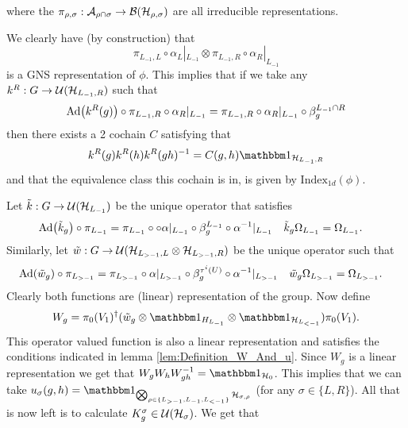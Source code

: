 \documentclass[12pt,a4paper,twoside]{article}
\numberwithin{equation}{section}
\begin{document}
where the $\pi_{\rho,\sigma}:\mathcal A_{\rho\cap\sigma}\rightarrow\mathcal B(\mathcal H_{\rho,\sigma})$ are all irreducible representations.
\begin{remark}\label{rem:GNS_One_Dimensional}
	We clearly have (by construction) that
	\begin{equation}
		\pi_{L_{-1},L}\circ\alpha_L|_{L_{-1}}\otimes \pi_{L_{-1},R}\circ\alpha_R|_{L_{-1}}
	\end{equation}
	is a GNS representation of $\phi$. This implies that if we take any $k^R:G\rightarrow \mathcal U(\mathcal H_{L_{-1},R})$ such that
	\begin{equation}
		\Ad{k^R(g)}\circ\pi_{L_{-1},R}\circ\alpha_R|_{L_{-1}}=\pi_{L_{-1},R}\circ\alpha_R|_{L_{-1}}\circ\beta_{g}^{L_{-1}\cap R}
	\end{equation}
	then there exists a 2 cochain $C$ satisfying that
	\begin{equation}
		k^R(g)k^R(h)k^R(gh)^{-1}=C(g,h)\id_{\HH_{L_{-1},R}}
	\end{equation}
	and that the equivalence class this cochain is in, is given by $\textrm{Index}_{1d}(\phi)$.
\end{remark}
Let $\tilde k:G\rightarrow \mathcal U(\mathcal H_{L_{-1}})$ be the unique operator that satisfies
\begin{align}
	\Ad{\tilde{k}_g}\circ\pi_{L_{-1}}&=\pi_{L_{-1}}\circ \circ\alpha|_{L_{-1}}\circ\beta_g^{L_{-1}}\circ \alpha^{-1}|_{L_{-1}}&\tilde k_g\Omega_{L_{-1}}&=\Omega_{L_{-1}}.
\end{align}
Similarly, let $\tilde{w}:G\rightarrow\mathcal U(\mathcal H_{L_{>-1},L}\otimes\mathcal H_{L_{>-1},R})$ be the unique operator such that
\begin{align}
	\Ad{\tilde w_{g}}\circ\pi_{L_{>-1}}&=\pi_{L_{>-1}}\circ\alpha|_{L_{>-1}}\circ\beta_g^{\tau^{i}(U)}\circ \alpha^{-1}|_{L_{>-1}}&\tilde w_{g}\Omega_{L_{>-1}}&=\Omega_{L_{>-1}}.
\end{align}
Clearly both functions are (linear) representation of the group. Now define
\begin{equation}\label{eq:ChoiceOfW_g_ExampleH2Index}
	W_g=\pi_{0}(V_1)^{\dagger}(\tilde{w}_g\otimes\id_{H_{L_{-1}}}\otimes\id_{\HH_{L_{<-1}}}) \pi_{0}(V_1).
\end{equation}
This operator valued function is also a linear representation and satisfies the conditions indicated in lemma \ref{lem:Definition_W_And_u}. Since $W_g$ is a linear representation we get that $W_gW_hW_{gh}^{-1}=\id_{\HH_0}$. This implies that we can take $u_\sigma(g,h)=\id_{\bigotimes_{\rho\in\{L_{>-1},L_{-1},L_{<-1}\}}\HH_{\sigma,\rho}}$ (for any $\sigma\in\{L,R\}$). All that is now left is to calculate $K^\sigma_g\in\mathcal U(\mathcal H_\sigma)$. We get that
\end{document}
